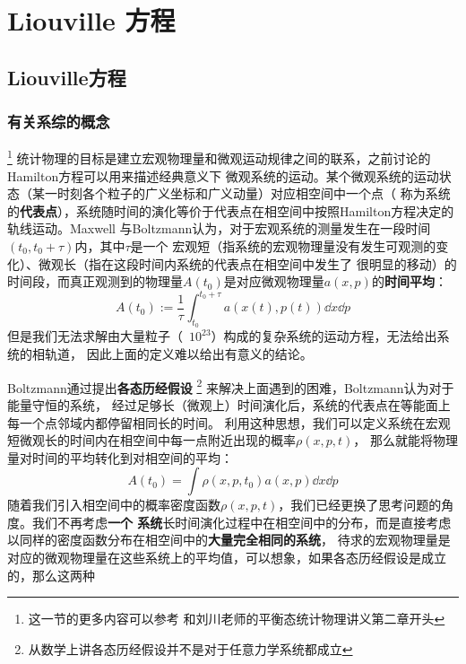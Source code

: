 \chapter{Liouville 方程}
    \section{Liouville方程}
    \subsection{有关系综的概念}\footnote{这一节的更多内容可以参考\cite{Tuckerman2010Statistical}
    和刘川老师的平衡态统计物理讲义第二章开头}
    统计物理的目标是建立宏观物理量和微观运动规律之间的联系，之前讨论的Hamilton方程可以用来描述经典意义下
    微观系统的运动。某个微观系统的运动状态（某一时刻各个粒子的广义坐标和广义动量）对应相空间中一个点（
    称为系统的\textbf{代表点}），系统随时间的演化等价于代表点在相空间中按照Hamilton方程决定的轨线运动。Maxwell
    与Boltzmann认为，对于宏观系统的测量发生在一段时间$(t_0, t_0 + \tau)$内，其中$\tau$是一个
    宏观短（指系统的宏观物理量没有发生可观测的变化）、微观长（指在这段时间内系统的代表点在相空间中发生了
    很明显的移动）的时间段，而真正观测到的物理量$A(t_0)$是对应微观物理量$a(x,p)$的\textbf{时间平均}：
    \begin{equation}
        A(t_0) := \frac{1}{\tau}\int_{t_0}^{t_0+\tau}a(x(t), p(t))\dd x\dd p
    \end{equation}
    但是我们无法求解由大量粒子（~$10^{23}$）构成的复杂系统的运动方程，无法给出系统的相轨道，
    因此上面的定义难以给出有意义的结论。
    \par 
    Boltzmann通过提出\textbf{各态历经假设}
    \footnote{从数学上讲各态历经假设并不是对于任意力学系统都成立}
    来解决上面遇到的困难，Boltzmann认为对于能量守恒的系统，
    经过足够长（微观上）时间演化后，系统的代表点在等能面上每一个点邻域内都停留相同长的时间。
    利用这种思想，我们可以定义系统在宏观短微观长的时间内在相空间中每一点附近出现的概率$\rho(x, p, t)$，
    那么就能将物理量对时间的平均转化到对相空间的平均：
    \begin{equation}
        A(t_0) = \int\rho(x, p, t_0)a(x, p)\dd x\dd p
    \end{equation}
    随着我们引入相空间中的概率密度函数$\rho(x, p, t)$，我们已经更换了思考问题的角度。我们不再考虑\textbf{一个
    系统}长时间演化过程中在相空间中的分布，而是直接考虑以同样的密度函数分布在相空间中的\textbf{大量完全相同的系统}，
    待求的宏观物理量是对应的微观物理量在这些系统上的平均值，可以想象，如果各态历经假设是成立的，那么这两种
